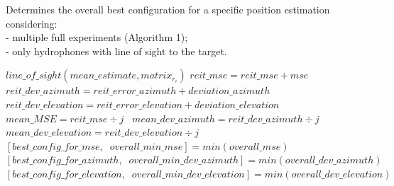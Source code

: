 \begin{algorithm}
	\scriptsize		%
	\caption{Determines the overall best configuration for a specific position estimation considering: \\- multiple full experiments (Algorithm 1); \\ - only hydrophones with line of sight to the target.}
	\label{alg:alg2}
	\begin{algorithmic}[1]
		\STATE {\texttt{**************************}}
		\STATE {\texttt{**************************}}
		\STATE
		\STATE $line\_of\_sight(mean\_estimate, matrix_{r_{i}})$
		\STATE
		\STATE \texttt{$reit\_mse = reit\_mse + mse$ }
		\STATE \texttt{$reit\_dev\_azimuth = reit\_error\_azimuth + deviation\_azimuth$ } 
		\STATE \texttt{$reit\_dev\_elevation = reit\_error\_elevation + deviation\_elevation$} 
		\ENDFOR
		\STATE \texttt{$mean\_MSE = reit\_mse \div j$ }
		\STATE \texttt{$mean\_dev\_azimuth = reit\_dev\_azimuth \div j$ } 
		\STATE \texttt{$mean\_dev\_elevation = reit\_dev\_elevation \div  j$} 
		\STATE
		\STATE
		\STATE $[best\_config\_for\_mse,\; \; overall\_min\_mse] = min(overall\_mse)$
		\STATE $[best\_config\_for\_azimuth,\; \; overall\_min\_dev\_azimuth] = min(overall\_dev\_azimuth)$
		\STATE $[best\_config\_for\_elevation,\; \; overall\_min\_dev\_elevation] = min(overall\_dev\_elevation)$
	\end{algorithmic}
\end{algorithm}

